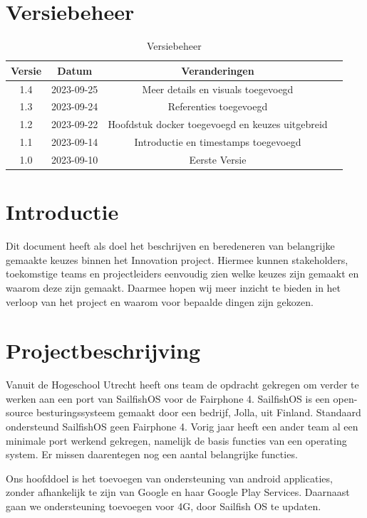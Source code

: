 \documentclass[a4paper]{report}
\begin{document}
\chapter{Versiebeheer}
\begin{table}[h]
    \centering
    \begin{tabular}{|c|c|c|p{5cm}|}
        \hline
        \textbf{Versie} & \textbf{Datum} & \textbf{Veranderingen}  \\
        \hline
        1.4    & 2023-09-25 & Meer details en visuals toegevoegd \\
        \hline
        1.3    & 2023-09-24 & Referenties toegevoegd \\
        \hline
        1.2    & 2023-09-22 & Hoofdstuk docker toegevoegd en keuzes uitgebreid \\
        \hline
        1.1    & 2023-09-14 & Introductie en timestamps toegevoegd\\
        \hline
        1.0    & 2023-09-10 & Eerste Versie \\
        \hline
    \end{tabular}
    \caption{Versiebeheer}
\end{table}


\chapter{Introductie}
Dit document heeft als doel het beschrijven en beredeneren van belangrijke gemaakte keuzes binnen het Innovation project. 
Hiermee kunnen stakeholders, toekomstige teams en projectleiders eenvoudig zien welke keuzes zijn gemaakt en waarom deze zijn gemaakt.
Daarmee hopen wij meer inzicht te bieden in het verloop van het project en waarom voor bepaalde dingen zijn gekozen. 
\vspace{1.5cm}

\begingroup
\let\clearpage\relax
\chapter{Projectbeschrijving}
Vanuit de Hogeschool Utrecht heeft ons team de opdracht gekregen om verder te werken aan een port van SailfishOS voor de Fairphone 4.
SailfishOS is een open-source besturingssysteem gemaakt door een bedrijf, Jolla, uit Finland. Standaard ondersteund SailfishOS geen Fairphone 4.
Vorig jaar heeft een ander team al een minimale port werkend gekregen, namelijk de basis functies van een operating system. Er missen daarentegen nog een aantal belangrijke functies.
\par \smallskip
Ons hoofddoel is het toevoegen van ondersteuning van android applicaties, zonder afhankelijk te zijn van Google en haar Google Play Services\texttrademark. 
Daarnaast gaan we ondersteuning toevoegen voor 4G, door Sailfish OS te updaten.
\endgroup
\end{document}
